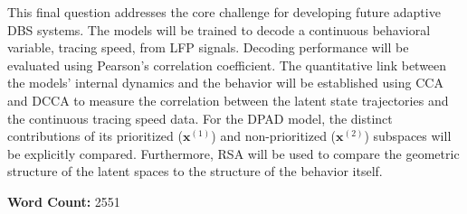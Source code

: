 \documentclass[12pt, a4paper]{article}
\begin{document}
This final question addresses the core challenge for developing future adaptive DBS systems. The models will be trained to decode a continuous behavioral variable, tracing speed, from LFP signals. Decoding performance will be evaluated using Pearson's correlation coefficient. The quantitative link between the models' internal dynamics and the behavior will be established using CCA and DCCA to measure the correlation between the latent state trajectories and the continuous tracing speed data. For the DPAD model, the distinct contributions of its prioritized ($\mathbf{x}^{(1)}$) and non-prioritized ($\mathbf{x}^{(2)}$) subspaces will be explicitly compared. Furthermore, RSA will be used to compare the geometric structure of the latent spaces to the structure of the behavior itself.


\vspace{1em}
\noindent\textbf{Word Count:} 2551
\newpage
\end{document}
